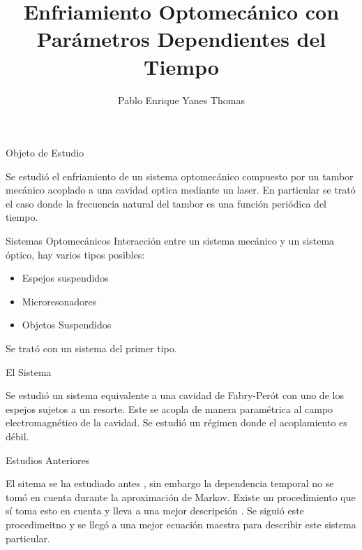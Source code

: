 \documentclass[11pt]{beamer}
\author{Pablo Enrique Yanes Thomas}
\title{Enfriamiento Optomecánico con Parámetros Dependientes del Tiempo}
\begin{document}
\begin{frame}
\titlepage
\end{frame}


\begin{frame}{Objeto de Estudio}

Se estudió el enfriamiento de un sistema optomecánico compuesto por un tambor mecánico acoplado a una cavidad optica mediante un laser. En particular se trató el caso donde la frecuencia natural del tambor es una función periódica del tiempo.

\end{frame}

\begin{frame}{Sistemas Optomecánicos}
Interacción entre un sistema mecánico y un sistema óptico, hay varios tipos posibles:

\begin{itemize}
\item Espejos suspendidos
\item Microresonadores
\item Objetos Suspendidos
\end{itemize}

Se trató con un sistema del primer tipo.

\end{frame}

\begin{frame}{El Sistema}

Se estudió un sistema equivalente a una cavidad de Fabry-Perót con uno de los espejos sujetos a un resorte. Este se acopla de manera paramétrica al campo electromagnético de la cavidad. Se estudió un régimen donde el acoplamiento es débil.

\end{frame}

\begin{frame}{Estudios Anteriores}

El sitema se ha estudiado antes \cite{BarberisLC}, sin embargo la dependencia temporal no se tomó en cuenta durante la aproximación de Markov. Existe un procedimiento que sí toma esto en cuenta y lleva a una mejor descripción \cite{HanngiFM}. Se siguió este procedimeitno y se llegó a una mejor ecuación maestra para describir este sistema particular.

\end{frame}
\end{document}
